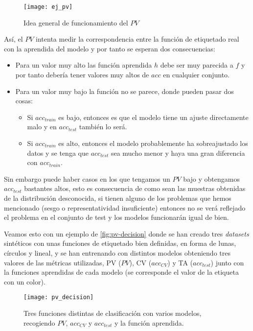 \begin{figure}[htpb]
  \centering
  \texttt{[image: ej\_pv]}
  \caption{Idea general de funcionamiento del $PV$}
  \label{fig:ej-pv}
\end{figure}

Así, el $PV$ intenta medir la correspondencia entre la función de etiquetado real con la aprendida del modelo y por tanto se esperan dos consecuencias:

\begin{itemize}
  \item Para un valor muy alto las función aprendida $h$ debe ser muy parecida a $f$ y por tanto debería tener valores muy altos de $acc$ en cualquier conjunto.
  \item Para un valor muy bajo la función no se parece, donde pueden pasar dos cosas:
    \begin{itemize}
      \item Si $acc_{train}$ es bajo, entonces es que el modelo tiene un ajuste directamente malo y en $acc_{test}$ también lo será.
      \item Si $acc_{train}$ es alto, entonces el modelo probablemente ha sobreajustado los datos y se tenga que $acc_{test}$ sea mucho menor y haya una gran diferencia con $acc_{train}$.
    \end{itemize}
\end{itemize}

Sin embargo puede haber casos en los que tengamos un $PV$ bajo y obtengamos $acc_{test}$ bastantes altos, esto es consecuencia de como sean las muestras obtenidas de la distribución desconocida, si tienen alguno de los problemas que hemos mencionado (sesgo o representatividad insuficiente) entonces no se verá reflejado el problema en el conjunto de test y los modelos funcionarán igual de bien.

Veamos esto con un ejemplo de \cite{zhang2019perturbation} \autoref{fig:pv-decision} donde se han creado tres \emph{datasets} sintéticos con unas funciones de etiquetado bien definidas, en forma de lunas, círculos y lineal, y se han entrenando con distintos modelos obteniendo tres valores de las métricas utilizadas, PV ($PV$), CV ($acc_{CV}$) y TA ($acc_{test}$) junto con la funciones aprendidas de cada modelo (se corresponde el valor de la etiqueta con un color).

\begin{figure}[htpb]
  \centering
  \hspace*{-1.cm}
  \texttt{[image: pv\_decision]}
  \caption{Tres funciones distintas de clasificación con varios modelos, recogiendo $PV$, $acc_{CV}$ y $acc_{test}$ y la función aprendida.}
  \label{fig:pv-decision}
\end{figure}

